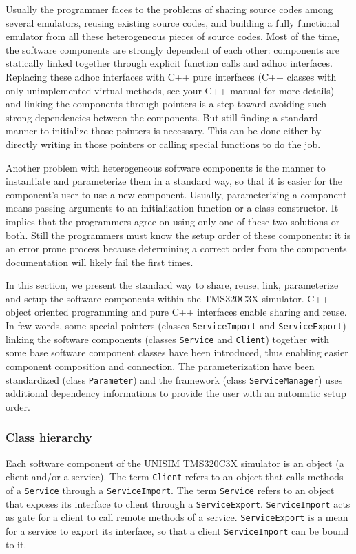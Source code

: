 Usually the programmer faces to the problems of sharing source codes among several emulators, reusing existing source codes, and building a fully functional emulator from all these heterogeneous pieces of source codes.
Most of the time, the software components are strongly dependent of each other: components are statically linked together through explicit function calls and adhoc interfaces.
Replacing these adhoc interfaces with C++ pure interfaces (C++ classes with only unimplemented virtual methods, see your C++ manual for more details) and linking the components through pointers is a step toward avoiding such strong dependencies between the components. But still finding a standard manner to initialize those pointers is necessary. This can be done either by directly writing in those pointers or calling special functions to do the job.

Another problem with heterogeneous software components is the manner to instantiate and parameterize them in a standard way, so that it is easier for the component's user to use a new component.
Usually, parameterizing a component means passing arguments to an initialization function or a class constructor. It implies that the programmers agree on using only one of these two solutions or both.
Still the programmers must know the setup order of these components: it is an error prone process because determining a correct order from the components documentation will likely fail the first times.

In this section, we present the standard way to share, reuse, link, parameterize and setup the software components within the TMS320C3X simulator.
C++ object oriented programming and pure C++ interfaces enable sharing and reuse.
In few words, some special pointers (classes \texttt{ServiceImport} and \texttt{ServiceExport}) linking the software components (classes \texttt{Service} and \texttt{Client}) together with some base software component classes have been introduced, thus enabling easier component composition and connection.
The parameterization have been standardized (class \texttt{Parameter}) and the framework (class \texttt{ServiceManager}) uses additional dependency informations to provide the user with an automatic setup order.

\subsubsection{Class hierarchy}

Each software component of the UNISIM TMS320C3X simulator is an object (a client and/or a service). 
The term \texttt{Client} refers to an object that calls methods of a \texttt{Service} through a \texttt{ServiceImport}. 
The term \texttt{Service} refers to an object that exposes its interface to client through a \texttt{ServiceExport}. 
\texttt{ServiceImport} acts as gate for a client to call remote methods of a service. \texttt{ServiceExport} is a mean for a service to export its interface, so that a client \texttt{ServiceImport} can be bound to it.

